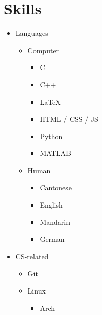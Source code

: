 \documentclass{article}
\begin{document}
\noindent\begin{minipage}{\textwidth}
    \section*{Skills}
    \begin{minipage}[t]{0.5\textwidth}
        \begin{itemize}
            \item Languages 
                \begin{itemize}
                    \item Computer
                        \begin{itemize}
                            \item C
                            \item C++
                            \item \LaTeX
                            \item HTML / CSS / JS
                            \item Python
                            \item MATLAB
                        \end{itemize}
                    \item Human
                        \begin{itemize}
                            \item Cantonese
                            \item English
                            \item Mandarin
                            \item German
                        \end{itemize}
                \end{itemize}
        \end{itemize}
    \end{minipage}%
    \begin{minipage}[t]{0.5\textwidth}
        \begin{itemize}
            \item CS-related
                \begin{itemize}
                    \item Git
                    \item Linux
                        \begin{itemize}
                            \item Arch

\end{itemize}
\end{itemize}
\end{itemize}
\end{minipage}
\end{minipage}
\end{document}
